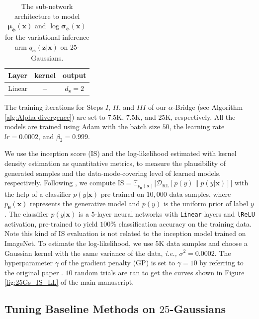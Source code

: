 \documentclass[letterpaper]{article} %
\newcommand{\Dc}[0]{\ensuremath{\mathcal{D}} }
\newcommand{\Ebb}[0]{\ensuremath{\mathbb{E}} }
\newcommand{\ie}[0]{\emph{i.e., }}
\newcommand{\xv}[0]{\ensuremath{\boldsymbol{x}} }
\newcommand{\zv}[0]{\ensuremath{\boldsymbol{z}} }
\newcommand{\thetav}[0]{\ensuremath{\boldsymbol{\theta}} }
\newcommand{\muv}[0]{\ensuremath{\boldsymbol{\mu}} }
\newcommand{\sigmav}[0]{\ensuremath{\boldsymbol{\sigma}} }
\newcommand{\phiv}[0]{\ensuremath{\boldsymbol{\phi}} }
\newcommand{\KL}[0]{\ensuremath{\mathrm{KL}} }
\begin{document}
\begin{table}[H]\centering
	\caption{The sub-network architecture to model $\muv_{\phiv}(\xv)$ and $\log\sigmav_{\phiv}(\xv)$ for the variational inference arm $q_{\phiv}(\zv|\xv)$ on $25$-Gaussians.}\label{tab:sub_q}
	\begin{tabular}{lcc}\hline\hline
		Layer               & kernel      & output        \\ \hline
		Linear              & $-$         &  $d_{\zv}=2$        \\ \hline\hline
	\end{tabular}
\end{table}


The training iterations for Steps $I$, $I\!I$, and $I\!I\!I$ of our $\alpha$-Bridge (see Algorithm \ref{alg:Alpha-divergence}) are set to $7.5$K, $7.5$K, and $25$K, respectively.
All the models are trained using Adam with the batch size $50$, the learning rate $lr=0.0002$, and $\beta_2=0.999$.

We use the inception score (IS) \cite{salimans2016improved} and the log-likelihood estimated with kernel density estimation \cite{parzen1962estimation} as quantitative metrics, to measure the plausibility of generated samples and the data-mode-covering level of learned models, respectively.
Following \cite{li2017alice}, we compute $\text{IS}=\Ebb_{p_{\thetav}(\xv)} \big[ \Dc_{\KL} [p(y)\|p(y|\xv)] \big]$ with the help of a classifier $p(y|\xv)$ pre-trained on $10,000$ data samples, where $p_{\thetav}(\xv)$ represents the generative model and $p(y)$ is the uniform prior of label $y$.
The classifier $p(y|\xv)$ is a $5$-layer neural networks with {\tt Linear} layers and {\tt lReLU} activation, pre-trained to yield $100\%$ classification accuracy on the training data.
Note this kind of IS evaluation is not related to the inception model trained on ImageNet. 
To estimate the log-likelihood, we use $5$K data samples and choose a Gaussian kernel with the same variance of the data, \ie $\sigma^2 = 0.0002$. The hyperparameter $\gamma$ of the gradient penalty (GP) is set to $\gamma=10$ by referring to the original paper \cite{mescheder2018training}. 
$10$ random trials are ran to get the curves shown in Figure \ref{fig:25Gs_IS_LL} of the main manuscript. 



\subsection{Tuning Baseline Methods on $25$-Gaussians}
\label{sec:app_tuningbase_25Gs}
\end{document}

